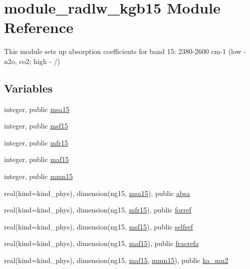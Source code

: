 \hypertarget{namespacemodule__radlw__kgb15}{}\section{module\+\_\+radlw\+\_\+kgb15 Module Reference}
\label{namespacemodule__radlw__kgb15}


This module sets up absorption coefficients for band 15\+: 2380-\/2600 cm-\/1 (low -\/ n2o, co2; high -\/ /)  


\subsection*{Variables}
\begin{DoxyCompactItemize}
\item 
integer, public \hyperlink{namespacemodule__radlw__kgb15_abb9e98034166a07a6e349631d7fbb2a3}{msa15}
\item 
integer, public \hyperlink{namespacemodule__radlw__kgb15_ae1b588ee60974c2d451c89f842601e07}{msf15}
\item 
integer, public \hyperlink{namespacemodule__radlw__kgb15_ad4d78009d0c7ffa27dbb228e68307675}{mfr15}
\item 
integer, public \hyperlink{namespacemodule__radlw__kgb15_a482858cf08fb1a14117dfbaa6a57fe8c}{maf15}
\item 
integer, public \hyperlink{namespacemodule__radlw__kgb15_a8ab45999cfc7b9db0f3d3b61ccf803e8}{mmn15}
\item 
real(kind=kind\+\_\+phys), dimension(ng15, \hyperlink{namespacemodule__radlw__kgb15_abb9e98034166a07a6e349631d7fbb2a3}{msa15}), public \hyperlink{namespacemodule__radlw__kgb15_aa6412ac501e2afed3d1b64b0cdcdab9e}{absa}
\item 
real(kind=kind\+\_\+phys), dimension(ng15, \hyperlink{namespacemodule__radlw__kgb15_ad4d78009d0c7ffa27dbb228e68307675}{mfr15}), public \hyperlink{namespacemodule__radlw__kgb15_ada70146d20f89f059141aa4cf58a0894}{forref}
\item 
real(kind=kind\+\_\+phys), dimension(ng15, \hyperlink{namespacemodule__radlw__kgb15_ae1b588ee60974c2d451c89f842601e07}{msf15}), public \hyperlink{namespacemodule__radlw__kgb15_a1d14e9b2e607f2022d84c6fc0cd27c4e}{selfref}
\item 
real(kind=kind\+\_\+phys), dimension(ng15, \hyperlink{namespacemodule__radlw__kgb15_a482858cf08fb1a14117dfbaa6a57fe8c}{maf15}), public \hyperlink{namespacemodule__radlw__kgb15_a4b5c5f6fd9ea806843adf78ec1b43cd2}{fracrefa}
\item 
real(kind=kind\+\_\+phys), dimension(ng15, \hyperlink{namespacemodule__radlw__kgb15_a482858cf08fb1a14117dfbaa6a57fe8c}{maf15}, \hyperlink{namespacemodule__radlw__kgb15_a8ab45999cfc7b9db0f3d3b61ccf803e8}{mmn15}), public \hyperlink{namespacemodule__radlw__kgb15_aff32d89fe8fef50ff79136cc7aa50526}{ka\+\_\+mn2}
\end{DoxyCompactItemize}


